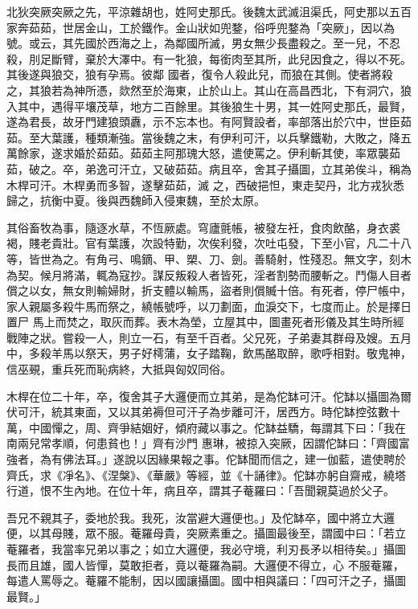 
\begin{pinyinscope}

 北狄突厥突厥之先，平涼雜胡也，姓阿史那氏。後魏太武滅沮渠氏，阿史那以五百家奔茹茹，世居金山，工於鐵作。金山狀如兜鍪，俗呼兜鍪為「突厥」，因以為號。或云，其先國於西海之上，為鄰國所滅，男女無少長盡殺之。至一兒，不忍殺，刖足斷臂，棄於大澤中。有一牝狼，每銜肉至其所，此兒因食之，得以不死。其後遂與狼交，狼有孕焉。彼鄰
 國者，復令人殺此兒，而狼在其側。使者將殺之，其狼若為神所憑，欻然至於海東，止於山上。其山在高昌西北，下有洞穴，狼入其中，遇得平壤茂草，地方二百餘里。其後狼生十男，其一姓阿史那氏，最賢，遂為君長，故牙門建狼頭纛，示不忘本也。有阿賢設者，率部落出於穴中，世臣茹茹。至大葉護，種類漸強。當後魏之末，有伊利可汗，以兵擊鐵勒，大敗之，降五萬餘家，遂求婚於茹茹。茹茹主阿那瑰大怒，遣使罵之。伊利斬其使，率眾襲茹茹，破之。卒，弟逸可汗立，又破茹茹。病且卒，舍其子攝圖，立其弟俟斗，稱為木桿可汗。木桿勇而多智，遂擊茹茹，滅
 之，西破挹怛，東走契丹，北方戎狄悉歸之，抗衡中夏。後與西魏師入侵東魏，至於太原。



 其俗畜牧為事，隨逐水草，不恆厥處。穹廬氈帳，被發左衽，食肉飲酪，身衣裘褐，賤老貴壯。官有葉護，次設特勤，次俟利發，次吐屯發，下至小官，凡二十八等，皆世為之。有角弓、鳴鏑、甲、槊、刀、劍。善騎射，性殘忍。無文字，刻木為契。候月將滿，輒為寇抄。謀反叛殺人者皆死，淫者割勢而腰斬之。鬥傷人目者償之以女，無女則輸婦財，折支體以輸馬，盜者則償贓十倍。有死者，停尸帳中，家人親屬多殺牛馬而祭之，繞帳號呼，以刀劃面，血淚交下，七度而止。於是擇日置尸
 馬上而焚之，取灰而葬。表木為塋，立屋其中，圖畫死者形儀及其生時所經戰陣之狀。嘗殺一人，則立一石，有至千百者。父兄死，子弟妻其群母及嫂。五月中，多殺羊馬以祭天，男子好樗蒲，女子踏鞠，飲馬酪取醉，歌呼相對。敬鬼神，信巫覡，重兵死而恥病終，大抵與匈奴同俗。



 木桿在位二十年，卒，復舍其子大邏便而立其弟，是為佗缽可汗。佗缽以攝圖為爾伏可汗，統其東面，又以其弟褥但可汗子為步離可汗，居西方。時佗缽控弦數十萬，中國憚之，周、齊爭結姻好，傾府藏以事之。佗缽益驕，每謂其下曰：「我在南兩兒常孝順，何患貧也！」齊有沙門
 惠琳，被掠入突厥，因謂佗缽曰：「齊國富強者，為有佛法耳。」遂說以因緣果報之事。佗缽聞而信之，建一伽藍，遣使聘於齊氏，求《凈名》、《涅槃》、《華嚴》等經，並《十誦律》。佗缽亦躬自齋戒，繞塔行道，恨不生內地。在位十年，病且卒，謂其子菴羅曰：「吾聞親莫過於父子。



 吾兄不親其子，委地於我。我死，汝當避大邏便也。」及佗缽卒，國中將立大邏便，以其母賤，眾不服。菴羅母貴，突厥素重之。攝圖最後至，謂國中曰：「若立菴羅者，我當率兄弟以事之；如立大邏便，我必守境，利刃長矛以相待矣。」攝圖長而且雄，國人皆憚，莫敢拒者，竟以菴羅為嗣。大邏便不得立，心
 不服菴羅，每遣人罵辱之。菴羅不能制，因以國讓攝圖。國中相與議曰：「四可汗之子，攝圖最賢。」




\end{pinyinscope}
